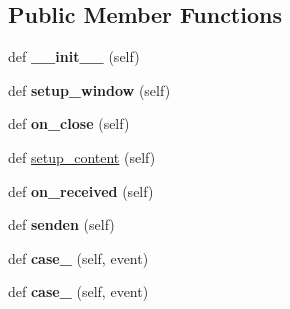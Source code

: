 \subsection*{Public Member Functions}
\begin{DoxyCompactItemize}
\item 
\mbox{\label{class_f_i_n_a_l___g_u_i___w_l_a_n_1_1_w_l_a_n_abd0bb3e25ffdc1d77064fdbe4fae547c}} 
def {\bfseries \+\_\+\+\_\+init\+\_\+\+\_\+} (self)
\item 
\mbox{\label{class_f_i_n_a_l___g_u_i___w_l_a_n_1_1_w_l_a_n_a2253446c57d221d8374f492d3b039edf}} 
def {\bfseries setup\+\_\+window} (self)
\item 
\mbox{\label{class_f_i_n_a_l___g_u_i___w_l_a_n_1_1_w_l_a_n_ae429bf3b670d0b265edc4b1a220d9c6a}} 
def {\bfseries on\+\_\+close} (self)
\item 
def \hyperlink{class_f_i_n_a_l___g_u_i___w_l_a_n_1_1_w_l_a_n_a5fe71f63b3060bb7a5d1511aa0eeaf1c}{setup\+\_\+content} (self)
\item 
\mbox{\label{class_f_i_n_a_l___g_u_i___w_l_a_n_1_1_w_l_a_n_a8a83ac894d6cdbc7a12003dcd2a1d274}} 
def {\bfseries on\+\_\+received} (self)
\item 
\mbox{\label{class_f_i_n_a_l___g_u_i___w_l_a_n_1_1_w_l_a_n_a8dd7e606685fb67b54e2c53626e46fba}} 
def {\bfseries senden} (self)
\item 
\mbox{\label{class_f_i_n_a_l___g_u_i___w_l_a_n_1_1_w_l_a_n_aa39317ec4b35d7765ffbbefa3a341935}} 
def {\bfseries case\+\_} (self, event)
\item 
\mbox{\label{class_f_i_n_a_l___g_u_i___w_l_a_n_1_1_w_l_a_n_ae350f0f04417a03ebbde210d60553283}} 
def {\bfseries case\+\_} (self, event)
\item 
\mbox{\label{class_f_i_n_a_l___g_u_i___w_l_a_n_1_1_w_l_a_n_a7f8af09fe47e662758efbe42031b3fb8}} 

\end{DoxyCompactItemize}
